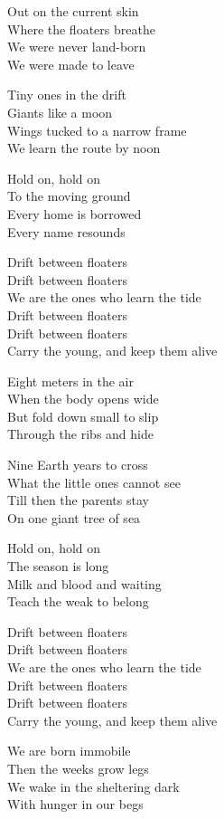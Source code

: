\begin{lyrics}
Out on the current skin\\
Where the floaters breathe\\
We were never land-born\\
We were made to leave

Tiny ones in the drift\\
Giants like a moon\\
Wings tucked to a narrow frame\\
We learn the route by noon

Hold on, hold on\\
To the moving ground\\
Every home is borrowed\\
Every name resounds

Drift between floaters\\
Drift between floaters\\
We are the ones who learn the tide\\
Drift between floaters\\
Drift between floaters\\
Carry the young, and keep them alive

Eight meters in the air\\
When the body opens wide\\
But fold down small to slip\\
Through the ribs and hide

Nine Earth years to cross\\
What the little ones cannot see\\
Till then the parents stay\\
On one giant tree of sea

Hold on, hold on\\
The season is long\\
Milk and blood and waiting\\
Teach the weak to belong

Drift between floaters\\
Drift between floaters\\
We are the ones who learn the tide\\
Drift between floaters\\
Drift between floaters\\
Carry the young, and keep them alive

We are born immobile\\
Then the weeks grow legs\\
We wake in the sheltering dark\\
With hunger in our begs


\end{lyrics}
